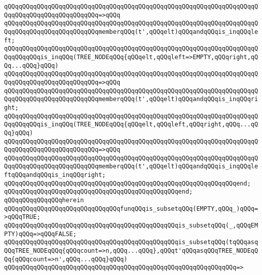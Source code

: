 \verb|qQQqqQQqqQQqqQQqqQQqqQQqqQQqqQQqqQQqqQQqqQQqqQQqqQQqqQQqqQQqqQQqqQQqqQQqqQQqqQQqqQQqqQQqqQQqqQQq=>qQQq|\newline
\verb|qQQqqQQqqQQqqQQqqQQqqQQqqQQqqQQqqQQqqQQqqQQqqQQqqQQqqQQqqQQqqQQqqQQqqQQqqQQqqQQqqQQqqQQqqQQqqQQqmemberqQQq(t',qQQqelt)qQQqandqQQqis_inqQQqleft;|\newline
\newline
\verb|qQQqqQQqqQQqqQQqqQQqqQQqqQQqqQQqqQQqqQQqqQQqqQQqqQQqqQQqqQQqqQQqqQQqqQQqqQQqqQQqis_inqQQq(TREE_NODEqQQq{qQQqelt,qQQqleft=>EMPTY,qQQqright,qQQq...qQQq}qQQq)|\newline
\verb|qQQqqQQqqQQqqQQqqQQqqQQqqQQqqQQqqQQqqQQqqQQqqQQqqQQqqQQqqQQqqQQqqQQqqQQqqQQqqQQqqQQqqQQqqQQqqQQq=>qQQq|\newline
\verb|qQQqqQQqqQQqqQQqqQQqqQQqqQQqqQQqqQQqqQQqqQQqqQQqqQQqqQQqqQQqqQQqqQQqqQQqqQQqqQQqqQQqqQQqqQQqqQQqmemberqQQq(t',qQQqelt)qQQqandqQQqis_inqQQqright;|\newline
\newline
\verb|qQQqqQQqqQQqqQQqqQQqqQQqqQQqqQQqqQQqqQQqqQQqqQQqqQQqqQQqqQQqqQQqqQQqqQQqqQQqqQQqis_inqQQq(TREE_NODEqQQq{qQQqelt,qQQqleft,qQQqright,qQQq...qQQq}qQQq)|\newline
\verb|qQQqqQQqqQQqqQQqqQQqqQQqqQQqqQQqqQQqqQQqqQQqqQQqqQQqqQQqqQQqqQQqqQQqqQQqqQQqqQQqqQQqqQQqqQQqqQQq=>qQQq|\newline
\verb|qQQqqQQqqQQqqQQqqQQqqQQqqQQqqQQqqQQqqQQqqQQqqQQqqQQqqQQqqQQqqQQqqQQqqQQqqQQqqQQqqQQqqQQqqQQqqQQqmemberqQQq(t',qQQqelt)qQQqandqQQqis_inqQQqleftqQQqandqQQqis_inqQQqright;|\newline
\verb|qQQqqQQqqQQqqQQqqQQqqQQqqQQqqQQqqQQqqQQqqQQqqQQqqQQqqQQqqQQqqQQqend;|\newline
\verb|qQQqqQQqqQQqqQQqqQQqqQQqqQQqqQQqqQQqqQQqqQQqqQQqend;|\newline
\newline
\verb|qQQqqQQqqQQqqQQqherein|\newline
\newline
\verb|qQQqqQQqqQQqqQQqqQQqqQQqqQQqqQQqfunqQQqis_subsetqQQq(EMPTY,qQQq_)qQQq=>qQQqTRUE;|\newline
\verb|qQQqqQQqqQQqqQQqqQQqqQQqqQQqqQQqqQQqqQQqqQQqqQQqis_subsetqQQq(_,qQQqEMPTY)qQQq=>qQQqFALSE;|\newline
\newline
\verb|qQQqqQQqqQQqqQQqqQQqqQQqqQQqqQQqqQQqqQQqqQQqqQQqis_subsetqQQq(tqQQqasqQQqTREE_NODEqQQq{qQQqcount=>n,qQQq...qQQq},qQQqt'qQQqasqQQqTREE_NODEqQQq{qQQqcount=>n',qQQq...qQQq}qQQq)|\newline
\verb|qQQqqQQqqQQqqQQqqQQqqQQqqQQqqQQqqQQqqQQqqQQqqQQqqQQqqQQqqQQqqQQq=>|\newline
